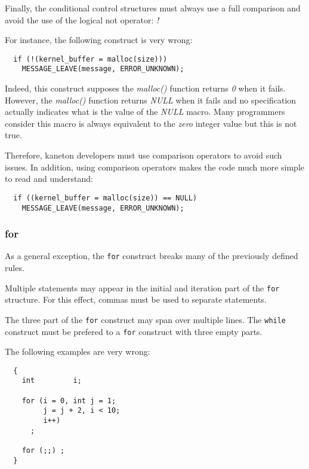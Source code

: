 Finally, the conditional control structures must always use a full
comparison and avoid the use of the logical not operator: \textit{!}

For instance, the following construct is very wrong:

\begin{verbatim}
  if (!(kernel_buffer = malloc(size)))
    MESSAGE_LEAVE(message, ERROR_UNKNOWN);
\end{verbatim}

Indeed, this construct supposes the \textit{malloc()} function returns
\textit{0} when it fails. However, the \textit{malloc()} function returns
\textit{NULL} when it fails and no specification actually indicates what
is the value of the \textit{NULL} macro. Many programmers consider this
macro is always equivalent to the \textit{zero} integer value but this is
not true.

Therefore, kaneton developers must use comparison operators to avoid such
issues. In addition, using comparison operators makes the code much
more simple to read and understand:

\begin{verbatim}
  if ((kernel_buffer = malloc(size)) == NULL)
    MESSAGE_LEAVE(message, ERROR_UNKNOWN);
\end{verbatim}


\subsubsection{for}

As a general exception, the \texttt{for} construct breaks many of the
previously defined rules.

Multiple statements may appear in the initial and iteration part of the
\texttt{for} structure. For this effect, commas must be used to separate
statements.

The three part of the \texttt{for} construct may span over multiple lines. The
\texttt{while} construct must be prefered to a \texttt{for} construct with
three empty parts.

The following examples are very wrong:

\begin{verbatim}
  {
    int         i;

    for (i = 0, int j = 1;
         j = j + 2, i < 10;
         i++)
      ;

    for (;;) ;
  }
\end{verbatim}

